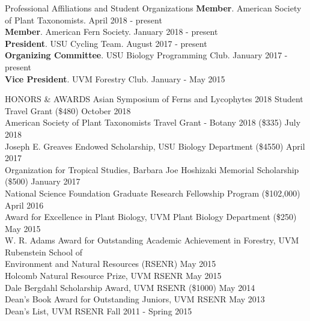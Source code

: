 \documentclass{resume} %
\begin{document}

\begin{rSection}{Professional Affiliations and Student Organizations}
\textbf{Member}. American Society of Plant Taxonomists. \hfill April 2018 - present
\\
\textbf{Member}. American Fern Society. \hfill January 2018 - present
\\
\textbf{President}. USU Cycling Team. \hfill August 2017 - present
\\
\textbf{Organizing Committee}. USU Biology Programming Club. \hfill January 2017 - present
\\
\textbf{Vice President}. UVM Forestry Club. \hfill January - May 2015
\end{rSection}


\begin{rSection}{HONORS \& AWARDS}
Asian Symposium of Ferns and Lycophytes 2018 Student Travel Grant (\$480) \hfill October 2018
\\
American Society of Plant Taxonomists Travel Grant - Botany 2018 (\$335) \hfill July 2018
\\
Joseph E. Greaves Endowed Scholarship, USU Biology Department (\$4550) \hfill April 2017
\\
Organization for Tropical Studies, Barbara Joe Hoshizaki Memorial Scholarship (\$500) \hfill January 2017
\\
National Science Foundation Graduate Research Fellowship Program (\$102,000) \hfill April 2016
\\
Award for Excellence in Plant Biology, UVM Plant Biology Department (\$250) \hfill May 2015
\\
W. R. Adams Award for Outstanding Academic Achievement in Forestry, UVM Rubenstein School of 
\\ \hspace*{1cm} Environment and Natural Resources (RSENR) \hfill May 2015
\\
Holcomb Natural Resource Prize, UVM RSENR \hfill May 2015
\\
Dale Bergdahl Scholarship Award, UVM RSENR (\$1000) \hfill May 2014
\\
Dean's Book Award for Outstanding Juniors, UVM RSENR \hfill May 2013
\\
Dean's List, UVM RSENR \hfill Fall 2011 - Spring 2015

\end{rSection} 
\end{document}
